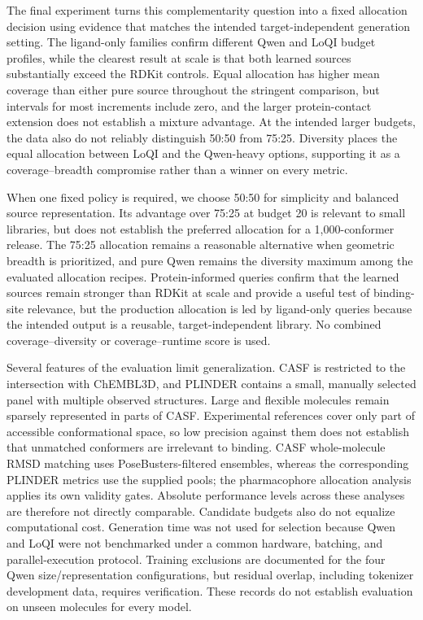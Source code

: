 The final experiment turns this complementarity question into a fixed allocation
decision using evidence that matches the intended target-independent generation
setting. The ligand-only families confirm different Qwen and LoQI budget profiles,
while the clearest result at scale is that both learned sources substantially exceed
the RDKit controls. Equal allocation has higher mean coverage than either pure source
throughout the stringent comparison, but intervals for most increments include zero,
and the larger protein-contact extension does not establish a mixture advantage.
At the intended larger budgets, the data also do not reliably distinguish 50:50 from
75:25. Diversity places the equal allocation between LoQI and the Qwen-heavy options,
supporting it as a coverage--breadth compromise rather than a winner on every metric.

When one fixed policy is required, we choose 50:50 for simplicity and balanced source
representation. Its advantage over 75:25 at budget 20 is relevant to small libraries,
but does not establish the preferred allocation for a 1,000-conformer release. The
75:25 allocation remains a reasonable alternative when geometric breadth is prioritized,
and pure Qwen remains the diversity maximum among the evaluated allocation recipes.
Protein-informed queries confirm that the learned sources remain stronger than RDKit
at scale and provide a useful test of binding-site relevance, but the production
allocation is led by ligand-only queries because the intended output is a reusable,
target-independent library. No combined coverage--diversity or coverage--runtime
score is used.

Several features of the evaluation limit generalization. CASF is restricted to the intersection
with ChEMBL3D, and PLINDER contains a small, manually selected panel with multiple observed
structures. Large and flexible molecules remain sparsely represented in parts of CASF.
Experimental references cover only part of accessible conformational space, so low precision
against them does not establish that unmatched conformers are irrelevant to binding.
CASF whole-molecule RMSD matching uses PoseBusters-filtered ensembles, whereas the
corresponding PLINDER metrics use the supplied pools; the pharmacophore allocation
analysis applies its own validity gates. Absolute performance levels across these
analyses are therefore not directly comparable. Candidate
budgets also do not equalize computational cost. Generation time was not used for
selection because Qwen and LoQI were not benchmarked under a common hardware,
batching, and parallel-execution protocol. Training exclusions are documented
for the four Qwen size/representation configurations, but residual overlap, including
tokenizer development data, requires verification. These records do not
establish evaluation on unseen molecules for every model.

